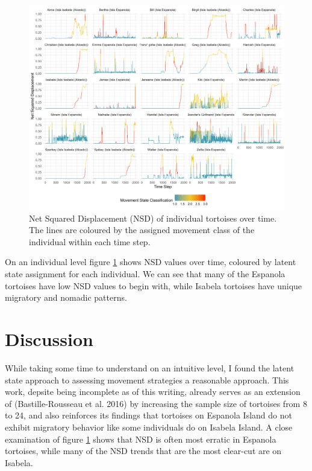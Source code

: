 \documentclass{article}
\begin{document}
\begin{figure}
\centering
\includegraphics[scale=.6]{"../plots/NSD2.png"}
\caption{Net Squared Displacement (NSD) of individual tortoises over time. The lines are coloured by the assigned movement class of the individual within each time step.}
\label{fig:eh}
\end{figure}

On an individual level figure \ref{fig:eh} shows NSD values over time,
coloured by latent state assignment for each individual. We can see that
many of the Espanola tortoises have low NSD values to begin with, while
Isabela tortoises have unique migratory and nomadic patterns.

\hypertarget{discussion}{%
\section{Discussion}\label{discussion}}

While taking some time to understand on an intuitive level, I found the
latent state approach to assessing movement strategies a reasonable
approach. This work, depsite being incomplete as of this writing,
already serves as an extension of (Bastille-Rousseau et al. 2016) by
increasing the sample size of tortoises from 8 to 24, and also
reinforces its findings that tortoises on Espanola Island do not exhibit
migratory behavior like some individuals do on Isabela Island. A close
examination of figure \ref{fig:eh} shows that NSD is often most erratic
in Espanola tortoises, while many of the NSD trends that are the most
clear-cut are on Isabela.
\end{document}
